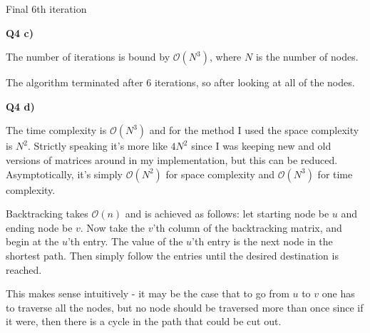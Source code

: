 \documentclass{article}
\begin{document}
Final 6th iteration

	
\textbf{Q4 c)}

	The number of iterations is bound by $\mathcal{O}(N^3)$, where $N$ is the number of nodes. 
	
	The algorithm terminated after 6 iterations, so after looking at all of the nodes.
	
\textbf{Q4 d)}
	
	The time complexity is $\mathcal{O}(N^3)$ and for the method I used the space complexity is $N^2$. Strictly speaking it's more like $4N^2$ since I was keeping new and old versions of matrices around in my implementation, but this can be reduced. Asymptotically, it's simply $\mathcal{O}(N^2)$ for space complexity and $\mathcal{O}(N^3)$ for time complexity.
	
	Backtracking takes $\mathcal{O}(n)$ and is achieved as follows: let starting node be $u$ and ending node be $v$. Now take the $v$'th column of the backtracking matrix, and begin at the $u$'th entry. The value of the $u$'th entry is the next node in the shortest path. Then simply follow the entries until the desired destination is reached. 
	
	This makes sense intuitively - it may be the case that to go from $u$ to $v$ one has to traverse all the nodes, but no node should be traversed more than once since if it were, then there is a cycle in the path that could be cut out.
	
\end{document}
